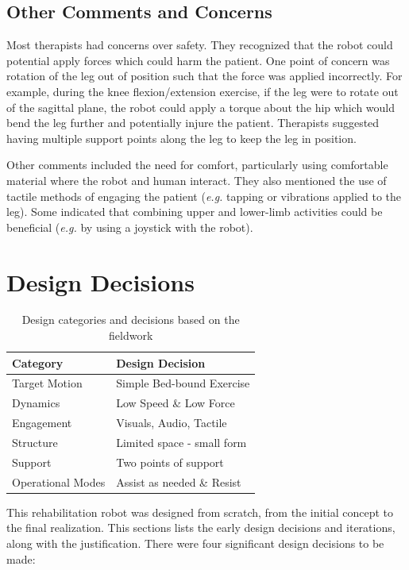 \documentclass[12pt]{report}
\begin{document}
	\subsection{Other Comments and Concerns}
	
	Most therapists had concerns over safety. They recognized that the robot could potential apply forces which could harm the patient. One point of concern was rotation of the leg out of position such that the force was applied incorrectly. For example, during the knee flexion/extension exercise, if the leg were to rotate out of the sagittal plane, the robot could apply a torque about the hip which would bend the leg further and potentially injure the patient. Therapists suggested having multiple support points along the leg to keep the leg in position. 
	
	Other comments included the need for comfort, particularly using comfortable material where the robot and human interact. They also mentioned the use of tactile methods of engaging the patient (\textit{e.g.} tapping or vibrations applied to the leg). Some indicated that combining upper and lower-limb activities could be beneficial (\textit{e.g.} by using a joystick with the robot). 
	
\section{Design Decisions} 

	\begin{table}[]
	\centering
	\caption{Design categories and decisions based on the fieldwork}	
	\begin{tabular}{|l|l|}
		\hline
		\cellcolor{gray!10} Category & \cellcolor{gray!10} Design Decision  \\
		\hline
		Target Motion & Simple Bed-bound Exercise \\
		\hline
		Dynamics & Low Speed \& Low Force \\
		\hline
		Engagement & Visuals, Audio, Tactile \\
		\hline
		Structure & Limited space - small form \\
		\hline
		Support & Two points of support \\
		\hline
		Operational Modes & Assist as needed \& Resist \\
		\hline
		\end{tabular}
	\label{tab:fieldwork}
	\end{table}
	

	This rehabilitation robot was designed from scratch, from the initial concept to the final realization. This sections lists the early design decisions and iterations, along with the justification. There were four significant design decisions to be made:
	
\end{document}
